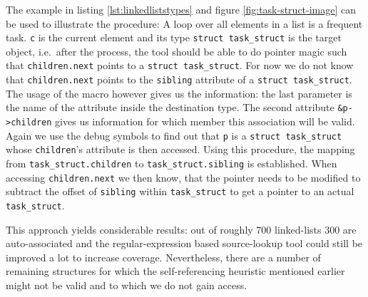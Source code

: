 The example in listing \ref{lst:linkedliststypes} and figure \ref{fig:task-struct-image} can be used to illustrate the procedure:
A loop over all elements in a list is a frequent task.
\texttt{c} is the current element and its type \texttt{struct task\_struct} is the target object, i.e.~after the process, the tool should be able to do pointer magic such that \texttt{children.next} points to a \texttt{struct task\_struct}.
For now we do not know that \texttt{children.next} points to the \texttt{sibling} attribute of a \texttt{struct task\_struct}.
The usage of the macro however gives us the information: the last parameter is the name of the attribute inside the destination type.
The second attribute \texttt{\&p->children} gives us information for which member this association will be valid.
Again we use the debug symbols to find out that \texttt{p} is a \texttt{struct task\_struct} whose \texttt{children}’s attribute is then accessed.
\newline
Using this procedure, the mapping from \texttt{task\_struct.children} to \texttt{task\_struct.sibling} is established.
When accessing \texttt{children.next} we then know, that the pointer needs to be modified to subtract the offset of \texttt{sibling} within \texttt{task\_struct} to get a pointer to an actual \texttt{task\_struct}.

This approach yields considerable results: out of roughly 700 linked-lists 300 are auto-associated and the 
regular-expression based source-lookup tool could still be improved a lot to increase coverage. Nevertheless, 
there are a number of remaining structures for which the self-referencing heuristic mentioned earlier might 
not be valid and to which we do not gain access.

